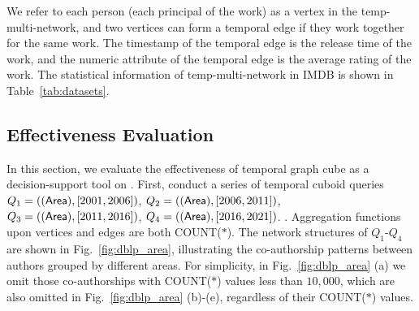 \documentclass[10pt,journal,compsoc]{IEEEtran}
\begin{document}

We refer to each person (each principal of the work) as a vertex in the temp-multi-network, and two vertices can form a temporal edge if they work together for the same work. The timestamp of the temporal edge is the release time of the work, and the numeric attribute of the temporal edge is the average rating of the work. The statistical information of temp-multi-network in IMDB is shown in Table~\ref{tab:datasets}.

\subsection{Effectiveness Evaluation} \label{subsec:effectiveness_eva}
In this section, we evaluate the effectiveness of temporal graph cube as a decision-support tool on . First,  conduct a series of temporal cuboid queries $ Q_1=(({\mathsf{Area}}),[2001,2006]) $, $ Q_2=(({\mathsf{Area}}),[2006,2011]) $, $ Q_3=(({\mathsf{Area}}),[2011,2016]) $, $ Q_4=(({\mathsf{Area}}),[2016,2021]) $. . Aggregation functions upon vertices and edges are both COUNT($\ast$). The network structures of $ Q_1 $-$ Q_4 $  are shown in Fig.~\ref{fig:dblp_area}, illustrating the co-authorship patterns between authors grouped by different areas. For simplicity, in Fig.~\ref{fig:dblp_area} (a) we omit those co-authorships with COUNT($\ast$) values less than $ 10,000 $, which are also omitted in Fig.~\ref{fig:dblp_area} (b)-(e), regardless of their COUNT($\ast$) values.
\end{document}
